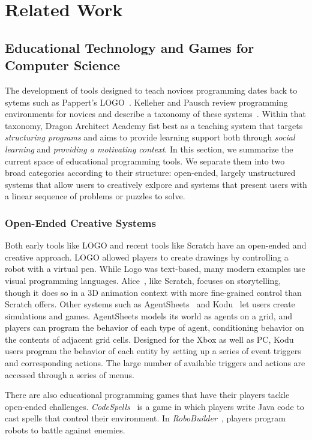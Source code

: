 \documentclass{sig-alternate}
\newcommand{\gametitle}{{\color{RoyalPurple} Dragon Architect Academy}}
\begin{document}
\section{Related Work}

\subsection{Educational Technology and Games for Computer Science}

The development of tools designed to teach novices programming dates back to sytems such as Pappert's LOGO~\cite{papert80mindstorms}.
Kelleher and Pausch review programming environments for novices and describe a taxonomy of these systems~\cite{kelleher2005lowering}.
Within that taxonomy, \gametitle{} fist best as a teaching system that targets \emph{structuring programs} and aims to provide learning support both through \emph{social learning} and \emph{providing a motivating context}. 
In this section, we summarize the current space of educational programming tools. 
We separate them into two broad categories according to their structure: open-ended, largely unstructured systems that allow users to creatively exlpore and systems that present users with a linear sequence of problems or puzzles to solve. 

\subsubsection{Open-Ended Creative Systems}
Both early tools like LOGO and recent tools like Scratch have an open-ended and creative approach.
LOGO allowed players to create drawings by controlling a robot with a virtual pen.
While Logo was text-based, many modern examples use visual programming languages. 
Alice~\cite{cooper2000alice}, like Scratch, focuses on storytelling, though it does so in a 3D animation context with more fine-grained control than Scratch offers.
Other systems such as AgentSheets~\cite{repenning2000agentsheets} and Kodu~\cite{kodu} let users create simulations and games.
AgentSheets models its world as agents on a grid, and players can program the behavior of each type of agent, conditioning behavior on the contents of adjacent grid cells. 
Designed for the Xbox as well as PC, Kodu users program the behavior of each entity by setting up a series of event triggers and corresponding actions. The large number of available triggers and actions are accessed through a series of menus. 

There are also educational programming games that have their players tackle open-ended challenges.
\emph{CodeSpells}~\cite{esper2013codespells} is a game in which players write Java code to cast spells that control their environment. 
In \emph{RoboBuilder}~\cite{weintrop2013robobuilder}, players program robots to battle against enemies.
\end{document}
